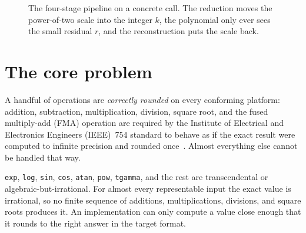 \documentclass[manuscript, nonacm]{acmart}
\begin{document}
    \begin{figure}[H]
        \centering
        \caption{The four-stage pipeline on a concrete call. The reduction
        moves the power-of-two scale into the integer $k$, the polynomial only
        ever sees the small residual $r$, and the reconstruction puts the scale
        back.}
        \label{fig:pipeline}
    \end{figure}



    \section{The core problem}
    \label{sec:core}

    A handful of operations are \emph{correctly rounded} on every conforming
    platform: addition, subtraction, multiplication, division, square root, and
    the fused multiply-add (FMA) operation are required by the Institute of Electrical and Electronics Engineers (IEEE)~754 standard to behave as if the exact result
    were computed to infinite precision and rounded once~\cite{ieee}.
    Almost everything else cannot be handled that way.

    \texttt{exp}, \texttt{log}, \texttt{sin}, \texttt{cos}, \texttt{atan},
    \texttt{pow}, \texttt{tgamma}, and the rest are transcendental or
    algebraic-but-irrational. For almost every representable input the exact
    value is irrational, so no finite sequence of additions, multiplications,
    divisions, and square roots produces it. An implementation can only
    compute a value close enough that it rounds to the right answer in the
    target format.
\end{document}
